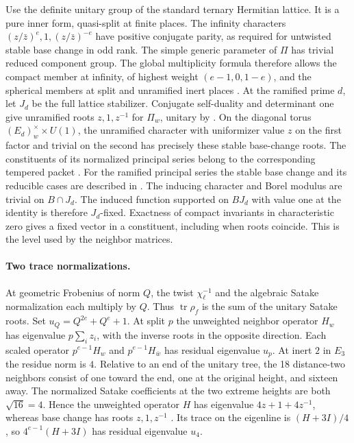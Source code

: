 \documentclass[11pt,a4paper]{article}
\newcommand{\tr}{\operatorname{tr}}
\begin{document}
Use the definite unitary group of the standard ternary Hermitian lattice.
It is a pure inner form, quasi-split at finite places. The infinity
characters \((z/\bar z)^e,1,(z/\bar z)^{-e}\) have positive conjugate
parity, as required for untwisted stable base change in odd rank.
The simple generic parameter of \(\Pi\) has trivial reduced component group. The global
multiplicity formula therefore allows the compact member at infinity,
of highest weight \((e-1,0,1-e)\), and the spherical members at split
and unramified inert places \cite[Ch.~5]{kmsw}.
At the ramified prime \(d\), let \(J_d\) be the full lattice stabilizer.
Conjugate self-duality and determinant one give unramified roots
\(z,1,z^{-1}\) for \(\Pi_w\), unitary by \cite[Cor.~1.3]{shin}.
On the diagonal torus \((E_d)_w^\times\times U(1)\), the unramified
character with uniformizer value \(z\) on the first factor and trivial on
the second has precisely these stable base-change roots. The constituents
of its normalized principal series belong to the corresponding tempered
packet \cite[\S4.7]{kmsw}. For the ramified principal series the stable base change and its reducible cases are described in \cite[\S4.4, Props.~6.1 and 7.1]{adler}. The inducing character and Borel modulus are
trivial on \(B\cap J_d\). The induced function supported on \(BJ_d\)
with value one at the identity is therefore \(J_d\)-fixed. Exactness of
compact invariants in characteristic zero gives a fixed vector in a
constituent, including when roots coincide. This is the level used by
the neighbor matrices.

\paragraph{Two trace normalizations.}
At geometric Frobenius of norm \(Q\), the twist \(\chi_\ell^{-1}\)
and the algebraic Satake normalization each multiply by \(Q\).
Thus \(\tr\rho_f\) is the sum of the unitary Satake roots.
Set \(u_Q=Q^{2e}+Q^e+1\). At split \(p\) the unweighted neighbor
operator \(H_w\) has eigenvalue \(p\sum_i z_i\), with the inverse
roots in the opposite direction. Each scaled operator \(p^{e-1}H_w\)
and \(p^{e-1}H_{\bar w}\) has residual eigenvalue \(u_p\).
At inert \(2\) in \(E_3\) the residue norm is \(4\). Relative to an
end of the unitary tree, the 18 distance-two neighbors consist of one
toward the end, one at the original height, and sixteen away.
The normalized Satake coefficients at the two extreme heights are both
\(\sqrt{16}=4\). Hence the unweighted operator \(H\) has eigenvalue
\(4z+1+4z^{-1}\), whereas base change has roots \(z,1,z^{-1}\)
\cite[Thm.~4.1]{minguez}. Its trace on the eigenline is \((H+3I)/4\),
so \(4^{e-1}(H+3I)\) has residual eigenvalue \(u_4\).
\end{document}
